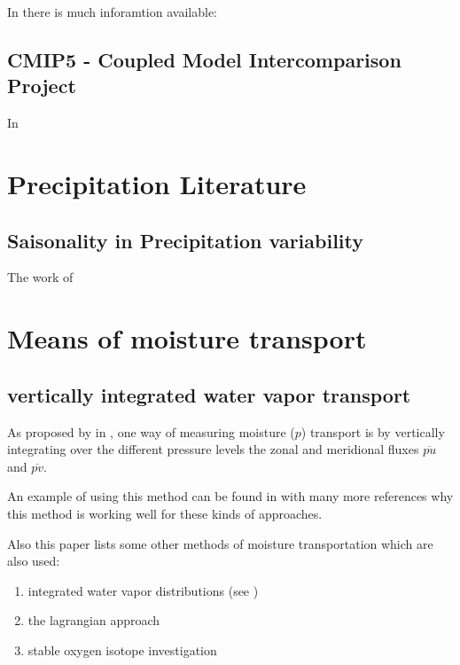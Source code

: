 In \cite{mpige} there is much inforamtion available:




\subsection{CMIP5 - Coupled Model Intercomparison Project}

In \cite{taylor2012overview_cmip5}


\section{Precipitation Literature}

\subsection{Saisonality in Precipitation variability}


The work of \citeauthor{precipitation_seasonality}

\section{Means of moisture transport}

\subsection{vertically integrated water vapor transport}

As proposed by \citeauthor{AProposedAlgorithmforMoistureFluxesfromAtmosphericRivers} in \cite{AProposedAlgorithmforMoistureFluxesfromAtmosphericRivers}, one way of measuring moisture ($p$) transport is by vertically integrating over the different pressure levels the zonal and meridional fluxes $\overline{pu}$ and $\overline{pv}$. 

An example of using this method can be found in \cite{Ayantobo2021IntegratedMT} with many more references why this method is working well for these kinds of approaches. 

Also this paper lists some other methods of moisture transportation which are also used:

\begin{enumerate}
  \item integrated water vapor distributions (see \cite{gimeno2014atmospheric_rivers_review})
  \item the lagrangian approach
  \item stable oxygen isotope investigation
\end{enumerate}

